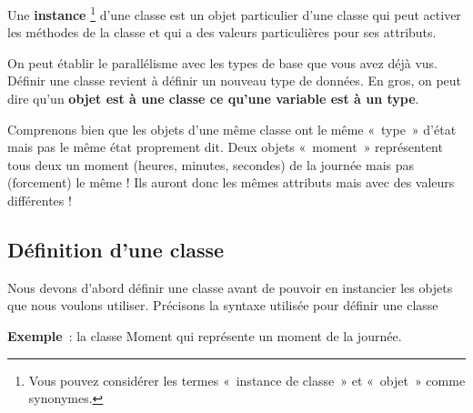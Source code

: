 	Une \textbf{instance}%
	\footnote{%
		Vous pouvez considérer les termes
		«~instance de classe~» et «~objet~» comme synonymes.
	}
	d'une classe est un objet particulier
	d'une classe qui peut activer les méthodes de la
	classe et qui a des valeurs particulières pour ses attributs.

	On peut établir le parallélisme avec les types de base que vous avez
	déjà vus. Définir une classe revient à définir un nouveau type de
	données. En gros, on peut dire qu'un \textbf{objet
	est à une classe ce qu'une variable est à un type}.
	
	Comprenons bien que les objets d'une même classe ont le
	même «~type~» d'état mais pas le même état proprement
	dit. Deux objets «~moment~» représentent tous deux un moment 
	(heures, minutes, secondes) de la journée mais pas (forcement) 
	le même ! Ils auront donc les mêmes attributs mais
	avec des valeurs différentes !
	
	\subsection{Définition d'une classe}
	
		Nous devons d'abord définir une classe avant de pouvoir
		en instancier les objets que nous voulons utiliser. Précisons la
		syntaxe utilisée pour définir une classe


		\textbf{Exemple}~: 
		la classe Moment qui représente un moment de la journée.


